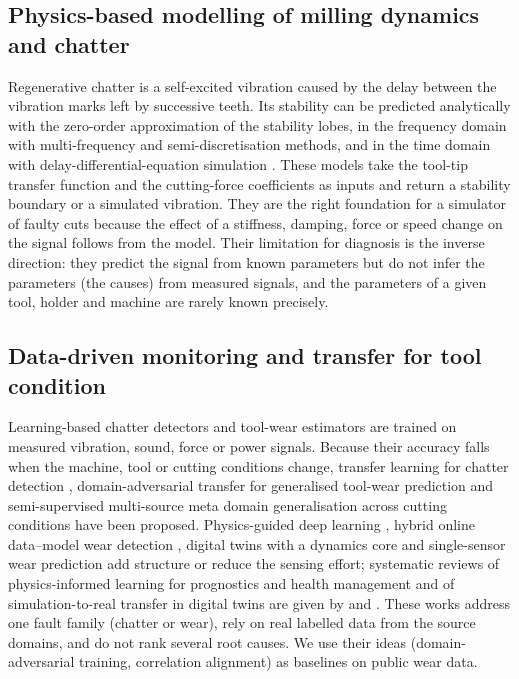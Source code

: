 \documentclass[11pt]{article}
\begin{document}
\subsection{Physics-based modelling of milling dynamics and chatter}
Regenerative chatter is a self-excited vibration caused by the delay between the vibration marks left by successive teeth.
Its stability can be predicted analytically with the zero-order approximation of the stability lobes, in the frequency domain with multi-frequency and semi-discretisation methods, and in the time domain with delay-differential-equation simulation \citep{altintas2020}.
These models take the tool-tip transfer function and the cutting-force coefficients as inputs and return a stability boundary or a simulated vibration.
They are the right foundation for a simulator of faulty cuts because the effect of a stiffness, damping, force or speed change on the signal follows from the model.
Their limitation for diagnosis is the inverse direction: they predict the signal from known parameters but do not infer the parameters (the causes) from measured signals, and the parameters of a given tool, holder and machine are rarely known precisely.

\subsection{Data-driven monitoring and transfer for tool condition}
Learning-based chatter detectors and tool-wear estimators are trained on measured vibration, sound, force or power signals.
Because their accuracy falls when the machine, tool or cutting conditions change, transfer learning for chatter detection \citep{yesilli2022tlchatter}, domain-adversarial transfer for generalised tool-wear prediction \citep{wang2020datwear} and semi-supervised multi-source meta domain generalisation across cutting conditions \citep{li2023metadg} have been proposed.
Physics-guided deep learning \citep{li2025physguided}, hybrid online data--model wear detection \citep{yang2022hybridwear}, digital twins with a dynamics core \citep{han2025dtmech} and single-sensor wear prediction \citep{hirsch2025singlesensor} add structure or reduce the sensing effort; systematic reviews of physics-informed learning for prognostics and health management and of simulation-to-real transfer in digital twins are given by \citet{braun2026pinnphm} and \citet{ma2025dtpdm}.
These works address one fault family (chatter or wear), rely on real labelled data from the source domains, and do not rank several root causes.
We use their ideas (domain-adversarial training, correlation alignment) as baselines on public wear data.
\end{document}
